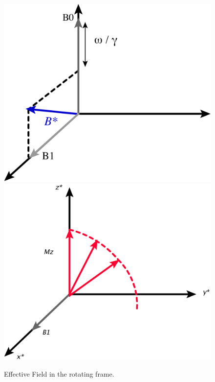 \documentclass[aps,prb,onecolumn,notitlepage,showpacs,floatfix,superscriptaddress]{revtex4-1}
\begin{document}
\begin{figure}[hbtp]
\centering
\includegraphics[scale=0.06]{B_in_RF.png} \includegraphics[scale=0.06]{pulsed.png}
\caption{Effective Field in the rotating frame.}
\end{figure}
\end{document}
